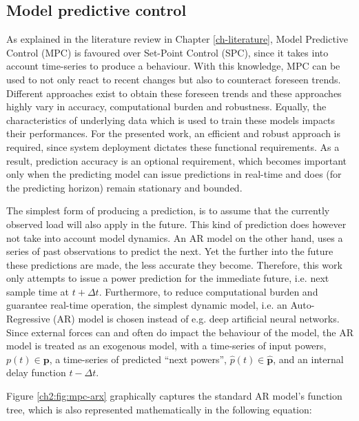 \subsection{Model predictive control}

As explained in the literature review in Chapter \ref{ch-literature}, Model Predictive Control (MPC) is favoured over Set-Point Control (SPC), since it takes into account time-series to produce a behaviour.
With this knowledge, MPC can be used to not only react to recent changes but also to counteract foreseen trends.
Different approaches exist to obtain these foreseen trends and these approaches highly vary in accuracy, computational burden and robustness.
Equally, the characteristics of underlying data which is used to train these models impacts their performances.
For the presented work, an efficient and robust approach is required, since system deployment dictates these functional requirements.
As a result, prediction accuracy is an optional requirement, which becomes important only when the predicting model can issue predictions in real-time and does (for the predicting horizon) remain stationary and bounded.

The simplest form of producing a prediction, is to assume that the currently observed load will also apply in the future.
This kind of prediction does however not take into account model dynamics.
An AR model on the other hand, uses a series of past observations to predict the next.
Yet the further into the future these predictions are made, the less accurate they become.
Therefore, this work only attempts to issue a power prediction for the immediate future, i.e. next sample time at $t+\Delta t$.
Furthermore, to reduce computational burden and guarantee real-time operation, the simplest dynamic model, i.e. an Auto-Regressive (AR) model is chosen instead of e.g. deep artificial neural networks.
Since external forces can and often do impact the behaviour of the model, the AR model is treated as an exogenous model, with a time-series of input powers, $p(t) \in \textbf{p}$, a time-series of predicted ``next powers'', $\hat{p}(t) \in \hat{\textbf{p}}$, and an internal delay function $t-\Delta t$.



Figure \ref{ch2:fig:mpc-arx} graphically captures the standard AR model's function tree, which is also represented mathematically in the following equation:



